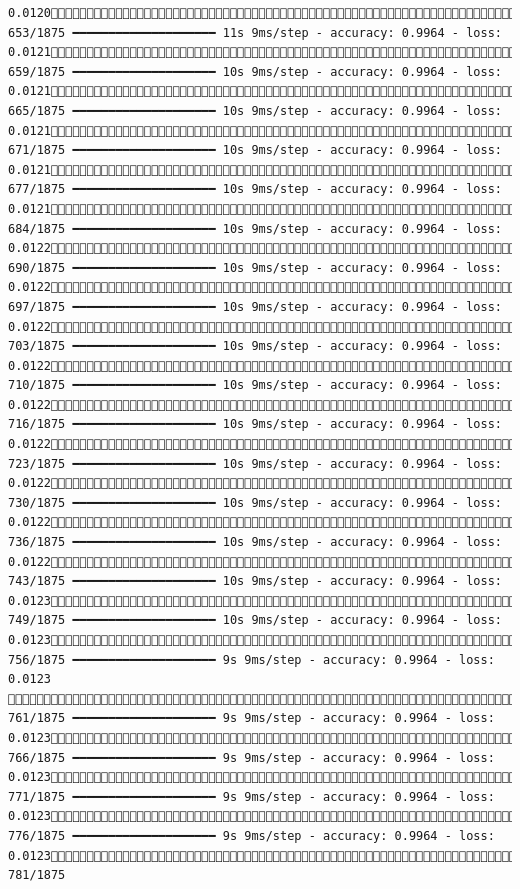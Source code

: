 \documentclass[
  letterpaper,
  DIV=11,
  numbers=noendperiod]{scrreprt}
\begin{document}
\begin{verbatim}
0.0120 653/1875 ━━━━━━━━━━━━━━━━━━━━ 11s 9ms/step - accuracy: 0.9964 - loss: 0.0121 659/1875 ━━━━━━━━━━━━━━━━━━━━ 10s 9ms/step - accuracy: 0.9964 - loss: 0.0121 665/1875 ━━━━━━━━━━━━━━━━━━━━ 10s 9ms/step - accuracy: 0.9964 - loss: 0.0121 671/1875 ━━━━━━━━━━━━━━━━━━━━ 10s 9ms/step - accuracy: 0.9964 - loss: 0.0121 677/1875 ━━━━━━━━━━━━━━━━━━━━ 10s 9ms/step - accuracy: 0.9964 - loss: 0.0121 684/1875 ━━━━━━━━━━━━━━━━━━━━ 10s 9ms/step - accuracy: 0.9964 - loss: 0.0122 690/1875 ━━━━━━━━━━━━━━━━━━━━ 10s 9ms/step - accuracy: 0.9964 - loss: 0.0122 697/1875 ━━━━━━━━━━━━━━━━━━━━ 10s 9ms/step - accuracy: 0.9964 - loss: 0.0122 703/1875 ━━━━━━━━━━━━━━━━━━━━ 10s 9ms/step - accuracy: 0.9964 - loss: 0.0122 710/1875 ━━━━━━━━━━━━━━━━━━━━ 10s 9ms/step - accuracy: 0.9964 - loss: 0.0122 716/1875 ━━━━━━━━━━━━━━━━━━━━ 10s 9ms/step - accuracy: 0.9964 - loss: 0.0122 723/1875 ━━━━━━━━━━━━━━━━━━━━ 10s 9ms/step - accuracy: 0.9964 - loss: 0.0122 730/1875 ━━━━━━━━━━━━━━━━━━━━ 10s 9ms/step - accuracy: 0.9964 - loss: 0.0122 736/1875 ━━━━━━━━━━━━━━━━━━━━ 10s 9ms/step - accuracy: 0.9964 - loss: 0.0122 743/1875 ━━━━━━━━━━━━━━━━━━━━ 10s 9ms/step - accuracy: 0.9964 - loss: 0.0123 749/1875 ━━━━━━━━━━━━━━━━━━━━ 10s 9ms/step - accuracy: 0.9964 - loss: 0.0123 756/1875 ━━━━━━━━━━━━━━━━━━━━ 9s 9ms/step - accuracy: 0.9964 - loss: 0.0123  761/1875 ━━━━━━━━━━━━━━━━━━━━ 9s 9ms/step - accuracy: 0.9964 - loss: 0.0123 766/1875 ━━━━━━━━━━━━━━━━━━━━ 9s 9ms/step - accuracy: 0.9964 - loss: 0.0123 771/1875 ━━━━━━━━━━━━━━━━━━━━ 9s 9ms/step - accuracy: 0.9964 - loss: 0.0123 776/1875 ━━━━━━━━━━━━━━━━━━━━ 9s 9ms/step - accuracy: 0.9964 - loss: 0.0123 781/1875 
\end{verbatim}
\end{document}

